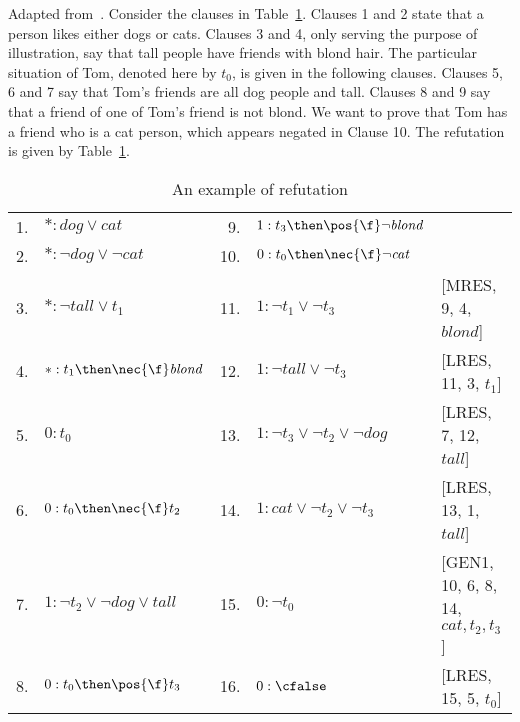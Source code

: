 \begin{example}
    Adapted from~\cite{Areces:1999:PRR,nalon2015modal}. Consider the clauses in
    Table~\ref{tab:calcunsat}. Clauses 1 and 2 state that a person likes either
    dogs or cats. Clauses 3 and 4, only serving the purpose of illustration,
    say that tall people have friends with blond hair. The particular situation
    of Tom, denoted here by $t_0$, is given in the following clauses. Clauses
    5, 6 and 7 say that Tom's friends are all dog people and tall. Clauses 8 and 9
    say that a friend of one of Tom's friend is not blond. We want to prove that Tom
    has a friend who is a cat person, which appears negated in Clause 10. The
    refutation is given by Table~\ref{tab:calcunsat}. 

    \begin{table}[h!]%
        \caption{An example of refutation}
        \centering%
        \begin{tabular}{rlrll}
            1.&$* : \mathit{dog} \lor \mathit{cat}$           & 9. &$1 : t_3 \then \pos{\f} \neg \mathit{blond}$        & \\
            2.&$* : \neg \mathit{dog} \lor \neg \mathit{cat}$ & 10.&$0 : t_0 \then \nec{\f} \neg \mathit{cat}$          & \\ 
            3.&$* : \neg \mathit{tall} \lor t_1$              & 11.&$1 : \neg t_1 \lor \neg t_3$                        & [MRES, 9, 4, $\mathit{blond}$]\\
            4.&$* : t_1 \then \nec{\f} \mathit{blond}$        & 12.&$1 : \neg \mathit{tall} \lor \neg t_3$              & [LRES, 11, 3, $t_1$]\\
            5.&$0 : t_0$                                      & 13.&$1 : \neg t_3 \lor \neg t_2 \lor \neg \mathit{dog}$ & [LRES, 7, 12, $\mathit{tall}$]\\
            6.&$0 : t_0 \then \nec{\f} t_2$                   & 14.&$1 : \mathit{cat} \lor \neg t_2 \lor \neg t_3$      & [LRES, 13, 1, $\mathit{tall}$]\\
            7.&$1 : \neg t_2 \lor \neg \mathit{dog} \lor \mathit{tall}$ & 15.&$0 : \neg t_0$ & [GEN1, 10, 6, 8, 14, $\mathit{cat},t_2,t_3$]\\
            8.&$0 : t_0 \then \pos{\f} t_3$                   & 16.&$0 : \cfalse$ & [LRES, 15, 5, $t_0$]\\
       \end{tabular}%
        \label{tab:calcunsat}
    \end{table}
\end{example}

